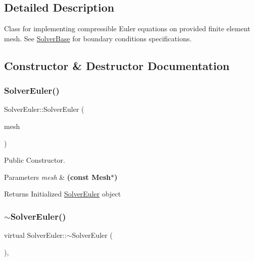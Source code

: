 \subsection{Detailed Description}
Class for implementing compressible Euler equations on provided finite element mesh. See \mbox{\hyperlink{class_solver_base}{Solver\+Base}} for boundary conditions specifications. 

\subsection{Constructor \& Destructor Documentation}
\mbox{\label{class_solver_euler_a775dd75545f3d9f69dab1c5ba2390edd}} 
\subsubsection{\texorpdfstring{Solver\+Euler()}{SolverEuler()}}
{\footnotesize\ttfamily Solver\+Euler\+::\+Solver\+Euler (\begin{DoxyParamCaption}\item[{const \mbox{\hyperlink{class_f_e_mesh}{F\+E\+Mesh}} $\ast$}]{mesh }\end{DoxyParamCaption})}



Public Constructor. 


\begin{DoxyParams}{Parameters}
{\em mesh} & {\bfseries (const Mesh$\ast$)} \\
\hline
\end{DoxyParams}
\begin{DoxyReturn}{Returns}
Initialized \mbox{\hyperlink{class_solver_euler}{Solver\+Euler}} object 
\end{DoxyReturn}
\mbox{\label{class_solver_euler_a16777db2c518c46a6c41f5437376e479}} 
\subsubsection{\texorpdfstring{$\sim$\+Solver\+Euler()}{~SolverEuler()}}
{\footnotesize\ttfamily virtual Solver\+Euler\+::$\sim$\+Solver\+Euler (\begin{DoxyParamCaption}{ }\end{DoxyParamCaption})\hspace{0.3cm}{\ttfamily [inline]}, {\ttfamily [virtual]}}



